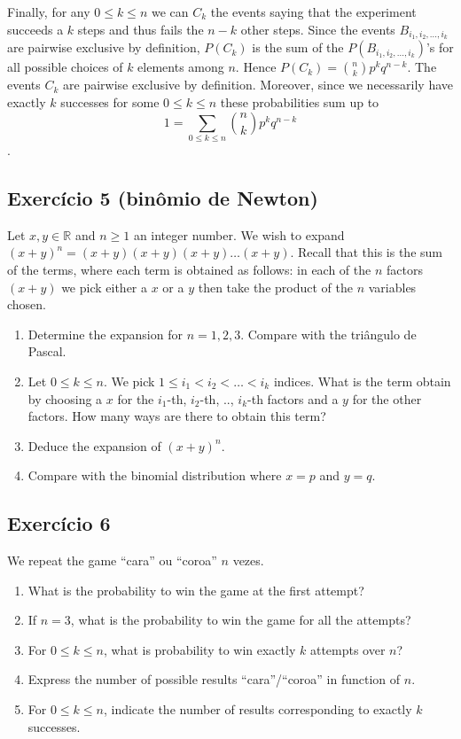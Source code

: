 Finally, for any $0 \leq k \leq n$ we can $C_k$ the events saying that the
experiment succeeds a $k$ steps and thus fails the $n-k$ other steps.
Since the events $B_{i_1, i_2, \dots, i_k}$ are pairwise exclusive by definition,
$P(C_k)$ is the sum of the $P(B_{i_1, i_2, \dots, i_k})$'s for all possible choices
of $k$ elements among $n$. Hence $P(C_k) = \binom{n}{k} p^k q^{n-k}$.
The events $C_k$ are pairwise exclusive by definition. Moreover, since we
necessarily have exactly $k$ successes for some $0 \leq k \leq n$
these probabilities sum up to
$$1 = \sum_{0 \leq k \leq n} \binom{n}{k} p^k q^{n-k}$$.

\subsection*{Exercício 5 (binômio de Newton)}

Let $x, y \in \mathbb R$ and $n \geq 1$ an integer number.
We wish to expand ${(x+y)}^n = {(x+y)}{(x+y)}{(x+y)}\dots{(x+y)}$.
Recall that this is the sum of the terms, where each term is obtained as
follows: in each of the $n$ factors $(x+y)$ we pick either a $x$ or a $y$ then
take the product of the $n$ variables chosen.

\begin{enumerate}
\item Determine the expansion for $n = 1, 2, 3$. Compare with the triângulo de
  Pascal.
\item Let $0 \leq k \leq n$. We pick $1 \leq i_1 < i_2 < \dots < i_k$ indices.
  What is the term obtain by choosing a $x$ for the $i_1$-th,
  $i_2$-th, .., $i_k$-th factors and a $y$ for the other factors.
  How many ways are there to obtain this term?
\item Deduce the expansion of ${(x+y)}^n$.
\item Compare with the binomial distribution where $x=p$ and $y=q$.
\end{enumerate}

\subsection*{Exercício 6}

We repeat the game ``cara'' ou ``coroa'' $n$ vezes.

\begin{enumerate}
\item What is the probability to win the game at the first attempt?
\item If $n=3$, what is the probability to win the game for all the attempts?
\item For $0 \leq k \leq n$,
  what is probability to win exactly $k$ attempts over $n$?
\item Express the number of possible results
  ``cara''/``coroa'' in function of $n$.
\item For $0 \leq k \leq n$, indicate the number of results corresponding to
  exactly $k$ successes.
\end{enumerate}

